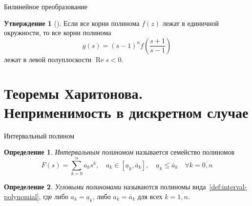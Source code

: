 \documentclass[notheorems,aspectratio=169]{beamer}
\theoremstyle{definition}
\newtheorem{definition}{Определение}
\newtheorem{proposition}{Утверждение}
\newcommand{\paren}[1]{\left(#1\right)}
\renewcommand{\Re}{\operatorname{Re}}
\begin{document}
\begin{frame}{Билинейное преобразование}
  \begin{proposition}[{\cite[с.~1214]{KrausAndersonMansour1988}}]
    Если все корни полинома $f(z)$ лежат в единичной окружности, то все корни полинома
    \begin{equation*}
      g(s) = {(s - 1)}^n f\paren{\frac{s+1}{s-1}}
    \end{equation*}
    лежат в левой полуплоскости $\Re{s} < 0$.
  \end{proposition}
\end{frame}

\section{Теоремы Харитонова. Неприменимость в дискретном случае}

\begin{frame}{Интервальный полином}
  \begin{definition}
    \textit{Интервальным полиномом} называется семейство полиномов
    \begin{equation}\label{def:interval-polynomial}
      F(s) = \sum_{k=0}^n a_k s^k,
      \quad a_k \in [\underline{a}_k, \overline{a}_k],
      \quad \underline{a}_k \leqslant \overline{a}_k
      \quad \forall k=\overline{0,n}
    \end{equation}
  \end{definition}

  \begin{definition}
    \textit{Угловыми полиномами} называются полиномы вида~\eqref{def:interval-polynomial},
    где либо \(a_k = \underline{a}_k\), либо
    \(a_k = \overline{a}_k\) для всех \(k=\overline{1,n}\).
  \end{definition}
\end{frame}
\end{document}
